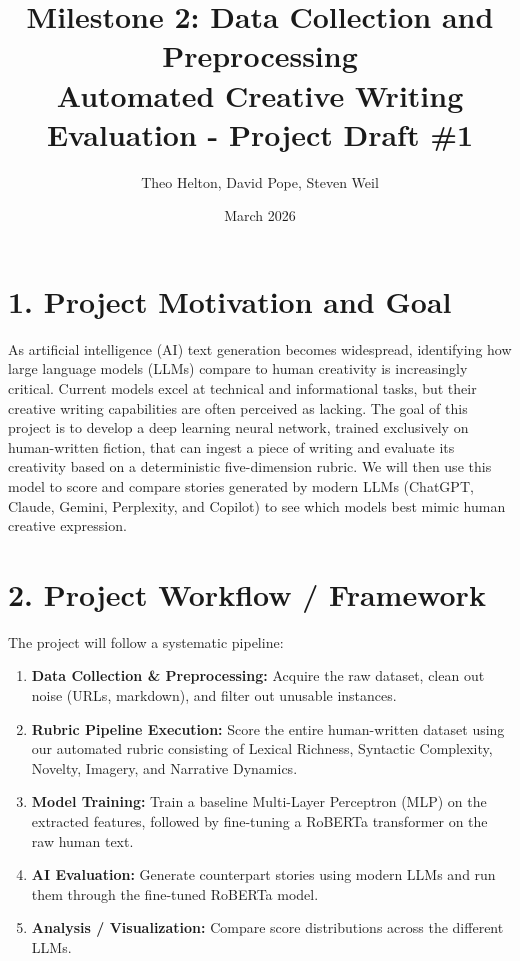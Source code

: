 \documentclass[12pt, a4paper]{article}
\title{\textbf{Milestone 2: Data Collection and Preprocessing} \\ \large Automated Creative Writing Evaluation - Project Draft \#1}
\author{Theo Helton, David Pope, Steven Weil}
\date{March 2026}
\begin{document}
\maketitle

\section*{1. Project Motivation and Goal}
As artificial intelligence (AI) text generation becomes widespread, identifying how large language models (LLMs) compare to human creativity is increasingly critical. Current models excel at technical and informational tasks, but their creative writing capabilities are often perceived as lacking. The goal of this project is to develop a deep learning neural network, trained exclusively on human-written fiction, that can ingest a piece of writing and evaluate its creativity based on a deterministic five-dimension rubric. We will then use this model to score and compare stories generated by modern LLMs (ChatGPT, Claude, Gemini, Perplexity, and Copilot) to see which models best mimic human creative expression.

\section*{2. Project Workflow / Framework}
The project will follow a systematic pipeline:
\begin{enumerate}[topsep=0pt,itemsep=-1ex,partopsep=1ex,parsep=1ex]
    \setlength{\itemsep}{1pt}
    \item \textbf{Data Collection \& Preprocessing:} Acquire the raw dataset, clean out noise (URLs, markdown), and filter out unusable instances.
    \item \textbf{Rubric Pipeline Execution:} Score the entire human-written dataset using our automated rubric consisting of Lexical Richness, Syntactic Complexity, Novelty, Imagery, and Narrative Dynamics.
    \item \textbf{Model Training:} Train a baseline Multi-Layer Perceptron (MLP) on the extracted features, followed by fine-tuning a RoBERTa transformer on the raw human text.
    \item \textbf{AI Evaluation:} Generate counterpart stories using modern LLMs and run them through the fine-tuned RoBERTa model.
    \item \textbf{Analysis / Visualization:} Compare score distributions across the different LLMs.
\end{enumerate}
\end{document}
